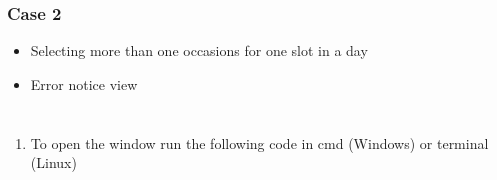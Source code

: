 \documentclass[letterpaper,10pt,english]{sphinxmanual}
\begin{document}


\subsubsection{Case 2}
\label{\detokenize{user_manual:case-2}}\begin{itemize}
\item {} 
Selecting more than one occasions for one slot in a day

\end{itemize}

\begin{itemize}
\item {} 
Error notice view

\end{itemize}



\section{}
\label{\detokenize{user_manual:working-in-gui-2}}

\subsection{}
\label{\detokenize{user_manual:id1}}
\begin{enumerate}
%
\item {} 
To open the window run the following code in cmd (Windows) or terminal (Linux)

\end{enumerate}

\begin{sphinxVerbatim}[commandchars=\\\{\}]
 
\end{sphinxVerbatim}
\end{document}
